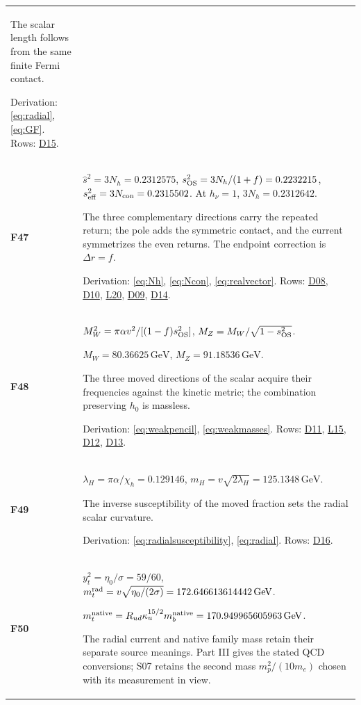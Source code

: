 \documentclass[aps,prx,onecolumn,10pt,notitlepage,nofootinbib,longbibliography]{revtex4-2}
\numberwithin{equation}{section}
\numberwithin{table}{section}
\newcommand{\GeV}{\,\mathrm{GeV}}
\begin{document}
\begin{longtable}{@{}>{\raggedright\arraybackslash}p{}>{\raggedright\arraybackslash}p{}@{}}
The scalar length follows from the same finite Fermi contact.\par
Derivation: \eqref{eq:radial}, \eqref{eq:GF}. Rows: \hyperlink{row-D15}{D15}.\\[7pt]
\hypertarget{formula-F47}{}\textbf{F47}\label{formula:F47} & $\widehat s^2=3N_h=0.2312575$, $s_{\rm OS}^2=3N_h/(1+f)=0.2232215$, $s_{\rm eff}^2=3N_{\rm con}=0.2315502$. At $h_\nu=1$, $3N_h=0.2312642$.\par
The three complementary directions carry the repeated return; the pole adds the symmetric contact, and the current symmetrizes the even returns. The endpoint correction is $\Delta r=f$.\par
Derivation: \eqref{eq:Nh}, \eqref{eq:Ncon}, \eqref{eq:realvector}. Rows: \hyperlink{row-D08}{D08}, \hyperlink{row-D10}{D10}, \hyperlink{row-L20}{L20}, \hyperlink{row-D09}{D09}, \hyperlink{row-D14}{D14}.\\[7pt]
\hypertarget{formula-F48}{}\textbf{F48}\label{formula:F48} & $M_W^2=\pi\alpha v^2/[(1-f)s_{\rm OS}^2]$, $M_Z=M_W/\sqrt{1-s_{\rm OS}^2}$.\par $M_W=80.36625\GeV$, $M_Z=91.18536\GeV$.\par
The three moved directions of the scalar acquire their frequencies against the kinetic metric; the combination preserving $h_0$ is massless.\par
Derivation: \eqref{eq:weakpencil}, \eqref{eq:weakmasses}. Rows: \hyperlink{row-D11}{D11}, \hyperlink{row-L15}{L15}, \hyperlink{row-D12}{D12}, \hyperlink{row-D13}{D13}.\\[7pt]
\hypertarget{formula-F49}{}\textbf{F49}\label{formula:F49} & $\lambda_H=\pi\alpha/\chi_h=0.129146$, $m_H=v\sqrt{2\lambda_H}=125.1348\GeV$.\par
The inverse susceptibility of the moved fraction sets the radial scalar curvature.\par
Derivation: \eqref{eq:radialsusceptibility}, \eqref{eq:radial}. Rows: \hyperlink{row-D16}{D16}.\\[7pt]
\hypertarget{formula-F50}{}\textbf{F50}\label{formula:F50} & $y_t^2=\eta_0/\sigma=59/60$, $m_t^{\rm rad}=v\sqrt{\eta_0/(2\sigma)}=172.646613614442\GeV$.\par $m_t^{\rm native}=R_{ud}\kappa_u^{15/2}m_b^{\rm native}=170.949965605963\GeV$.\par
The radial current and native family mass retain their separate source meanings. Part III gives the stated QCD conversions; S07 retains the second mass $m_p^2/(10m_e)$ chosen with its measurement in view.\par

\end{longtable}
\end{document}
